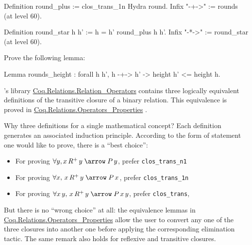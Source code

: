 \label{sect:infix-rounds} 

\begin{Coqsrc}
Definition round_plus := clos_trans_1n Hydra round.
Infix "-+->" := rounds (at level 60).

Definition round_star h h' := h = h' \/ round_plus h h'.
Infix "-*->" := round_star (at level 60).
\end{Coqsrc}



\begin{exercise}
Prove the following lemma:

\begin{Coqsrc}
Lemma rounds_height : forall h h', 
   h -+-> h' -> height h' <= height h.  
\end{Coqsrc}
  
\end{exercise}

\begin{remark}
\label{remark:transitive-closure}
\coq's library \href{https://coq.inria.fr/distrib/current/stdlib/Coq.Relations.Relation_Operators.html}{Coq.Relations.Relation\_Operators} 
contains three logically equivalent definitions of the transitive closure of a binary relation. This equivalence is proved in 
\href{https://coq.inria.fr/distrib/current/stdlib/Coq.Relations.Operators_Properties.html}{Coq.Relations.Operators\_Properties} . 

Why three definitions for a single mathematical concept?
Each definition generates an associated induction principle. 
 According to the form of statement one would like to prove, there is a ``best choice'':

\begin{itemize}
\item For proving $\forall y, x\,R^+\,y \;\arrow\; P\,y$, prefer 
\texttt{clos\_trans\_n1}
\item For proving $\forall x,\,x\,R^+\,y \;\arrow\; P\,x$, prefer \texttt{clos\_trans\_1n}
\item For proving $\forall x\,y, \,x\,R^+\,y \;\arrow\;P\,x\,y$,  
prefer \texttt{clos\_trans},
\end{itemize}
But there is no ``wrong choice'' at all: the equivalence lemmas in \linebreak 
\href{https://coq.inria.fr/distrib/current/stdlib/Coq.Relations.Operators_Properties.html}{Coq.Relations.Operators\_Properties} 
 allow the user
to convert any one of the three closures into another one before applying the corresponding elimination tactic.
The same remark also holds for reflexive and transitive closures. 
\end{remark}

